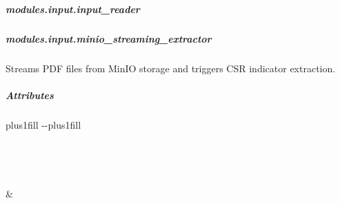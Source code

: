 \documentclass[letterpaper,10pt,english]{sphinxmanual}
\begin{document}
\sphinxstepscope


\subparagraph{modules.input.input\_reader}
\label{\detokenize{autoapi/modules/input/input_reader/index:module-modules.input.input_reader}}\label{\detokenize{autoapi/modules/input/input_reader/index:modules-input-input-reader}}\label{\detokenize{autoapi/modules/input/input_reader/index::doc}}
\sphinxstepscope


\subparagraph{modules.input.minio\_streaming\_extractor}
\label{\detokenize{autoapi/modules/input/minio_streaming_extractor/index:module-modules.input.minio_streaming_extractor}}\label{\detokenize{autoapi/modules/input/minio_streaming_extractor/index:modules-input-minio-streaming-extractor}}\label{\detokenize{autoapi/modules/input/minio_streaming_extractor/index::doc}}
\sphinxAtStartPar
Streams PDF files from MinIO storage and triggers CSR indicator extraction.


\subparagraph{Attributes}
\label{\detokenize{autoapi/modules/input/minio_streaming_extractor/index:attributes}}

\begin{savenotes}
\sphinxatlongtablestart
\sphinxthistablewithglobalstyle
\sphinxthistablewithnovlinesstyle
\makeatletter
  \LTleft \@totalleftmargin plus1fill
  \LTright\dimexpr\columnwidth-\@totalleftmargin-\linewidth\relax plus1fill
\makeatother
\begin{longtable}{}
\sphinxtoprule
\endfirsthead

\\
\sphinxtoprule
\endhead

\sphinxbottomrule
{}\\
\endfoot

\endlastfoot
\sphinxtableatstartofbodyhook

\sphinxAtStartPar
{\hyperref[\detokenize{autoapi/modules/input/minio_streaming_extractor/index:modules.input.minio_streaming_extractor.logger}]{}}
&
\sphinxAtStartPar

\\
\sphinxbottomrule
\end{longtable}
\sphinxtableafterendhook
\sphinxatlongtableend
\end{savenotes}
\end{document}
